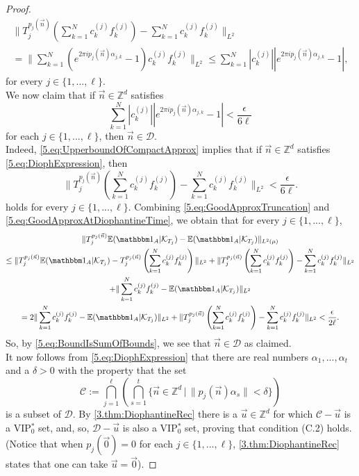\documentclass[11pt,american,preprint]{elsarticle}
\numberwithin{equation}{section}
\theoremstyle{plain}
\theoremstyle{plain*}
\theoremstyle{plain}
\theoremstyle{plain*}
\theoremstyle{plain}
\theoremstyle{plain*}
\theoremstyle{remark}
\theoremstyle{remark*}
\theoremstyle{remark}
\theoremstyle{remark*}
\theoremstyle{remark}
\theoremstyle{remark*}
\theoremstyle{plain}
\theoremstyle{definition}
\theoremstyle{plain}
\theoremstyle{plain} %
\newcommand{\Z}{\mathbb{Z}}
\begin{document}
\begin{proof}
\begin{multline}\label{5.eq:UpperboundOfCompactApprox}
\|T_j^{p_j(\vec n)}\left(\sum_{k=1}^Nc_k^{(j)}f_k^{(j)}\right)-\sum_{k=1}^Nc_k^{(j)}f_k^{(j)}\|_{L^2}\\
=\|\sum_{k=1}^N(e^{2\pi ip_j(\vec n)\alpha_{j,k}}-1)c_k^{(j)}f_k^{(j)}\|_{L^2}\leq \sum_{k=1}^N|c_k^{(j)}||e^{2\pi ip_j(\vec n)\alpha_{j,k}}-1|,
\end{multline}
for every $j\in\{1,...,\ell\}$.\\
We now claim that if $\vec n\in\Z^d$ satisfies 
\begin{equation}\label{5.eq:DiophExpression}
\sum_{k=1}^N|c_k^{(j)}||e^{2\pi ip_j(\vec n)\alpha_{j,k}}-1|<\frac{\epsilon}{6\ell}
\end{equation}
for  each $j\in\{1,...,\ell\}$, then $\vec n\in\mathcal D$.\\ 
Indeed, \eqref{5.eq:UpperboundOfCompactApprox} implies that if $\vec n\in\Z^d$ satisfies \eqref{5.eq:DiophExpression}, then 
\begin{equation}\label{5.eq:GoodApproxAtDiophantineTime}
\|T_j^{p_j(\vec n)}\left(\sum_{k=1}^Nc_k^{(j)}f_k^{(j)}\right)-\sum_{k=1}^Nc_k^{(j)}f_k^{(j)}\|_{L^2}<\frac{\epsilon}{6\ell}.
\end{equation}
holds for every $j\in\{1,...,\ell\}$. Combining  \eqref{5.eq:GoodApproxTruncation} and \eqref{5.eq:GoodApproxAtDiophantineTime}, we obtain that for every $j\in\{1,...,\ell\}$,
\begin{multline*}
\|T_j^{p_j(\vec n)}\mathbb E(\mathbbm 1_A|\mathcal K_{T_j})-\mathbb E(\mathbbm 1_A|\mathcal K_{T_j})\|_{L^2(\mu)}\\
\leq \|T_j^{p_j(\vec n)}\mathbb E(\mathbbm 1_A|\mathcal K_{T_j})-T_j^{p_j(\vec n)}\left(\sum_{k=1}^N c_k^{(j)}f_k^{(j)}\right)\|_{L^2}+\|T_j^{p_j(\vec n)}\left(\sum_{k=1}^N c_k^{(j)}f_k^{(j)}\right)-\sum_{k=1}^N c_k^{(j)}f_k^{(j)}\|_{L^2}\\
+\|\sum_{k=1}^N c_k^{(j)}f_k^{(j)}-\mathbb E(\mathbbm 1_A|\mathcal K_{T_j})\|_{L^2}\\
=2\|\sum_{k=1}^N c_k^{(j)}f_k^{(j)}-\mathbb E(\mathbbm 1_A|\mathcal K_{T_j})\|_{L^2}+\|T_j^{p_j(\vec n)}\left(\sum_{k=1}^N c_k^{(j)}f_k^{(j)}\right)-\sum_{k=1}^N c_k^{(j)}f_k^{(j)}\|_{L^2}<\frac{\epsilon}{2\ell}.
\end{multline*}
So, by  \eqref{5.eq:BoundIsSumOfBounds}, we see that $\vec n\in \mathcal D$ as claimed.\\
It now follows from \eqref{5.eq:DiophExpression} that there are real numbers $\alpha_1,...,\alpha_t$ and a $\delta>0$ with the property that the set 
$$
\mathcal C:=\bigcap_{j=1}^\ell \left(\bigcap_{s=1}^t\{\vec n\in \Z^d\,|\,
        \|p_j(\vec n)\alpha_s\|<\delta\}\right)
$$
is a subset of $\mathcal D$. By \cref{3.thm:DiophantineRec} there is a ${\vec u}\in\Z^d$ for which  $\mathcal C-{\vec u}$ is a  VIP$_0^*$ set, and, so, $\mathcal D-\vec u$ is also a VIP$_0^*$ set, proving that condition (C.2) holds. (Notice that when $p_j(\vec 0)=0$ for each $j\in\{1,...,\ell\}$, \cref{3.thm:DiophantineRec} states that one can take $\vec u=\vec 0$).
\end{proof}
\end{document}
